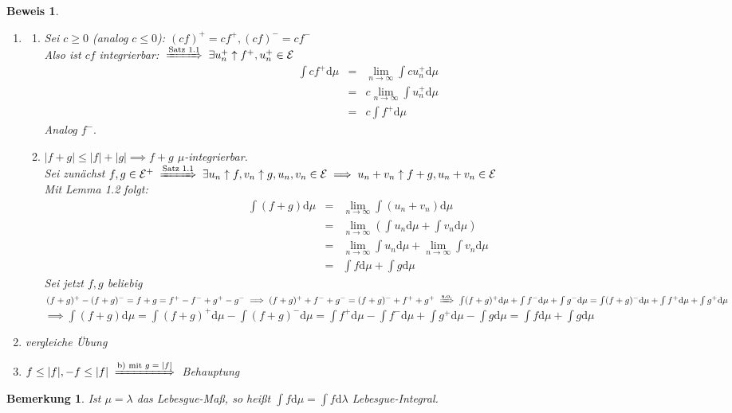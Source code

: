 \documentclass[a4paper,11pt]{book}
\def\EE{ \mathcal{E} }
\def\folgt{\ensuremath{\implies}}
\newcommand{\folgtnach}[1]{\ensuremath{\DOTSB\;\xRightarrow{\text{#1}}\;}}
\newtheorem{Bem}{Bemerkung}[chapter]
\theoremstyle{nonumberplain}
\newtheorem{Bew}{Beweis}
\begin{document}
\begin{Bew}
\begin{enumerate}
\item[a)]
\begin{enumerate}
\item[$\alpha$)] Sei $c\ge 0$ (analog $c\le 0$): $(cf)^+=cf^+, (cf)^-=cf^-$\\
Also ist $cf$ integrierbar: $\folgtnach{Satz 1.1}\exists u_n^+\uparrow f^+, u_n^+\in\EE$
\begin{eqnarray*}
\int cf^+\mbox{d}\mu &=& \lim_{n\to\infty}\int cu_n^+\mbox{d}\mu\\
&=& c\lim_{n\to\infty}\int u_n^+\mbox{d}\mu\\
&=& c\int f^+\mbox{d}\mu
\end{eqnarray*}
Analog $f^-.$
\item[$\beta$)] $|f+g|\le |f|+|g|\folgt f+g$ $\mu$-integrierbar.\\
Sei zunächst $f,g\in\EE^+\folgtnach{Satz 1.1}\exists u_n\uparrow f, v_n\uparrow g, u_n, v_n\in\EE\folgt u_n+v_n\uparrow f+g, u_n+v_n\in\EE$\\
Mit Lemma 1.2 folgt:
\begin{eqnarray*}
\int(f+g)\mbox{d}\mu &=& \lim_{n\to\infty}\int(u_n+v_n)\mbox{d}\mu\\
&=& \lim_{n\to\infty}(\int u_n\mbox{d}\mu+\int v_n\mbox{d}\mu)\\
&=& \lim_{n\to\infty}\int u_n\mbox{d}\mu+\lim_{n\to\infty}\int v_n\mbox{d}\mu\\
&=& \int f\mbox{d}\mu + \int g\mbox{d}\mu
\end{eqnarray*}
Sei jetzt $f, g$ beliebig\\
$(f+g)^+ -(f+g)^-= f+g=f^+-f^-+g^+-g^-\folgt (f+g)^++f^-+g^-=(f+g)^-+f^++g^+\folgtnach{s.o.}\int (f+g)^+\mbox{d}\mu+\int f^-\mbox{d}\mu+\int g^-\mbox{d}\mu=\int (f+g)^-\mbox{d}\mu+\int f^+\mbox{d}\mu +\int g^+\mbox{d}\mu$\\
$\folgt\int(f+g)\mbox{d}\mu=\int(f+g)^+\mbox{d}\mu-\int(f+g)^-\mbox{d}\mu=\int f^+\mbox{d}\mu - \int f^-\mbox{d}\mu + \int g^+\mbox{d}\mu -\int g\mbox{d}\mu=\int f\mbox{d}\mu + \int g\mbox{d}\mu$
\end{enumerate}
\item[b)] vergleiche Übung
\item[c)] $f\le|f|, -f\le|f|\folgtnach{b) mit $g=|f|$}$ Behauptung
\end{enumerate}
\end{Bew}

\begin{Bem} Ist $\mu=\lambda$ das Lebesgue-Maß, so heißt $\int f\mbox{d}\mu=\int f\mbox{d}\lambda$ Lebesgue-Integral.
\end{Bem}
\end{document}
